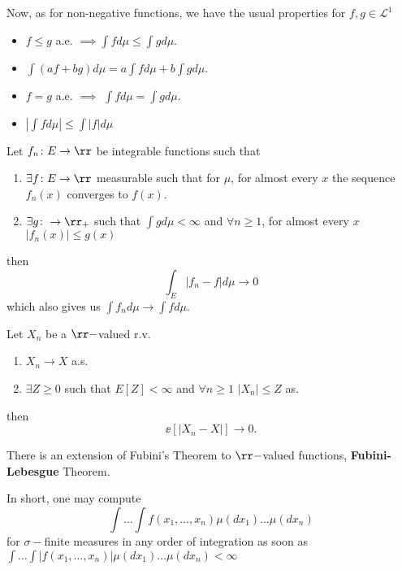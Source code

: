 \documentclass[../main.tex]{subfiles}
\begin{document}
Now, as for non-negative functions, we have the usual properties for
$f, g \in \mathcal{L}^1$
\begin{itemize}
  \item $f \leq g$ a.e. $\implies \int f d\mu \leq \int g d\mu$.
  \item $\int (af + bg) d\mu = a \int fd\mu + b \int gd\mu$.
  \item $f = g$ a.e. $\implies$ $\int f d\mu = \int g d\mu$.
  \item $\left| \int f d\mu \right| \leq \int |f|d\mu$
\end{itemize}

\begin{theorem}
  Let $f_n \colon E \to \rr$ be integrable functions such that 
  \begin{enumerate}
    \item $\exists f \colon E \to \rr$ measurable such that for $\mu$,
      for almost every $x$ the sequence $f_n(x)$ converges to $f(x)$.
    \item $\exists g \colon \to \rr_+$ such that $\int g d\mu <
      \infty$ and $\forall n \geq 1$, for almost every $x$ $|f_n(x)|
      \leq g(x)$
  \end{enumerate}
  then 
  \[
    \int_E |f_n - f| d\mu \to 0
  \]
  which also gives us $\int f_n d\mu \to \int f d\mu $.
\end{theorem}

\begin{theorem}
  Let $X_n$ be a $\rr-$valued r.v. 
  \begin{enumerate}
    \item $X_n \to X$ a.s.
    \item $\exists Z \geq 0$ such that $E[Z] < \infty$ and $\forall n
      \geq 1$ $|X_n| \leq Z$ as.
  \end{enumerate}
  then 
  \[
    \ee[|X_n - X|] \to 0
  .\] 
\end{theorem}

There is an extension of Fubini's Theorem to $\rr-$valued functions,
\textbf{\sffamily Fubini-Lebesgue} Theorem.

\vspace{0.3em}

In short, one may compute 
\[
  \int \ldots \int f(x_1, \ldots, x_n) \mu(dx_1) \ldots \mu(dx_n)
\]
for $\sigma-$finite measures in any order of integration as soon as
$\int \ldots \int |f(x_1, \ldots, x_n)| \mu(dx_1) \ldots \mu(dx_n) < \infty$
\end{document}
